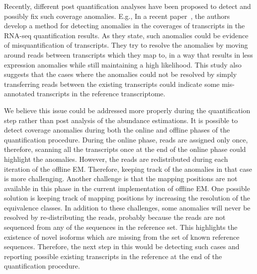 Recently, different post quantification analyses have been proposed to detect and possibly fix such
coverage anomalies. E.g., In a recent paper~\cite{ma2019detecting}, the authors develop a method for 
detecting anomalies in the coverages of transcripts in the RNA-seq quantification results. As they state, 
such anomalies could be evidence of misquantification of transcripts. They try to resolve the anomalies by 
moving around reads between transcripts which they map to, in a way that results in less expression anomalies 
while still maintaining a high likelihood. This study also suggests that the cases where the anomalies could 
not be resolved by simply transferring reads between the existing transcripts could indicate some mis-annotated 
transcripts in the reference transcriptome.


We believe this issue could be addressed more properly during the quantification step rather than post 
analysis of the abundance estimations.
It is possible to detect coverage anomalies during both the online 
and offline phases of the quantification procedure. During the online phase, reads are assigned only once, 
therefore, scanning all the transcripts once at the end of the online phase could highlight the anomalies. However, 
the reads are redistributed during each iteration of the offline EM. Therefore, keeping track of the anomalies 
in that case is more challenging. Another challenge is that the mapping positions are not available in this phase 
in the current implementation of offline EM. One possible solution is keeping track of mapping positions by 
increasing the resolution of the equivalence classes. In addition to these challenges, some anomalies will 
never be resolved by re-distributing the reads, probably because the reads are not sequenced from any of 
the sequences in the reference set. This highlights the existence of novel isoforms which are missing from 
the set of known reference sequences. Therefore, the next step in this would be detecting such cases and 
reporting possible existing transcripts in the reference at the end of the quantification procedure.

